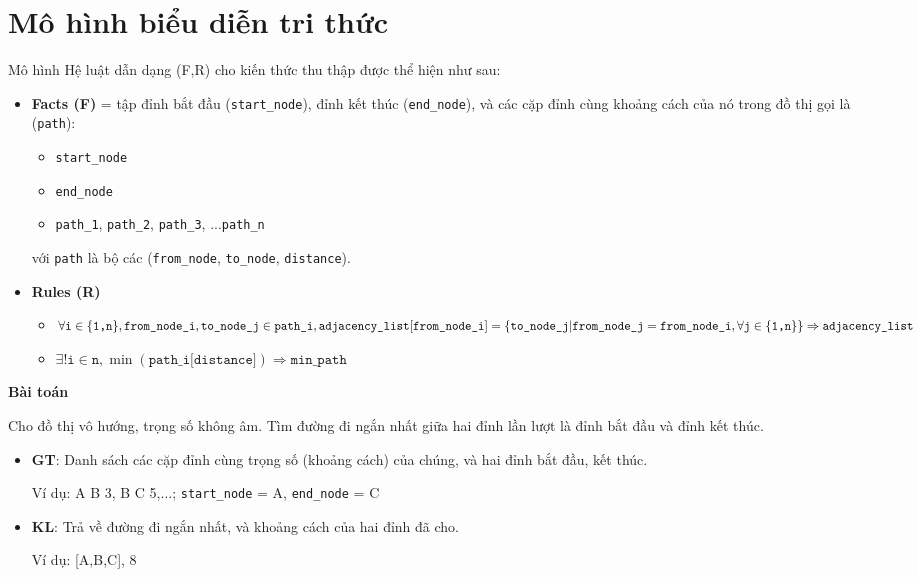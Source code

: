 \section{Mô hình biểu diễn tri thức} 

Mô hình Hệ luật dẫn dạng (F,R) cho kiến thức thu thập được thể hiện như sau:
\begin{itemize}
	\item \textbf{Facts (F)} = tập đỉnh bắt đầu (\texttt{start\_node}), đỉnh kết thúc (\texttt{end\_node}), và các cặp đỉnh cùng khoảng cách của nó trong đồ thị gọi là (\texttt{path}):
	\begin{itemize}
		\item \texttt{start\_node}
		\item \texttt{end\_node}
		\item \texttt{path\_1}, \texttt{path\_2}, \texttt{path\_3}, ...\texttt{path\_n}
	\end{itemize}
	
	với \texttt{path} là bộ các (\texttt{from\_node}, \texttt{to\_node}, \texttt{distance}).
	
	\item \textbf{Rules (R)}
	\begin{itemize}
		\item $\forall \texttt{i} \in \{\texttt{1,n}\}, \texttt{from\_node\_i}, \texttt{to\_node\_j} \in \texttt{path\_i}, \\ \texttt{adjacency\_list}[\texttt{from\_node\_i}]=\{ \texttt{to\_node\_j} | \texttt{from\_node\_j} = \texttt{from\_node\_i}, \forall \texttt{j} \in \{\texttt{1,n}\}\} \Rightarrow \texttt{adjacency\_list}$
		\item $\exists! \texttt{i} \in \texttt{n}, \min(\texttt{path\_i[distance]}) \Rightarrow \texttt{min\_path}$
	\end{itemize}
\end{itemize}


\textbf{Bài toán}

Cho đồ thị vô hướng, trọng số không âm. Tìm đường đi ngắn nhất giữa hai đỉnh lần lượt là đỉnh bắt đầu và đỉnh kết thúc.

\begin{itemize}
	\item \textbf{GT}: Danh sách các cặp đỉnh cùng trọng số (khoảng cách) của chúng, và hai đỉnh bắt đầu, kết thúc.
	
	Ví dụ: A B 3, B C 5,$\dots$; \texttt{start\_node} = A, \texttt{end\_node} = C
	\item \textbf{KL}: Trả về đường đi ngắn nhất, và khoảng cách của hai đỉnh đã cho. 
	
	Ví dụ: [A,B,C], 8
\end{itemize}

